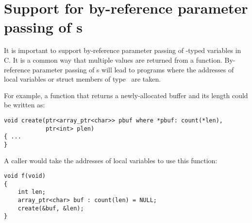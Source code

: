 \section{Support for by-reference parameter passing of \protect\arrayptr s}

It is important to support by-reference parameter passing of \arrayptr-typed variables
in C.  It is a common way that multiple values are returned from a function.  By-reference parameter
passing of \arrayptr s will lead to programs where the addresses of local variables or struct
members of type \arrayptr\ are taken.

For example, a function that returns a newly-allocated buffer and its length could be written as:
\begin{lstlisting}
void create(ptr<array_ptr<char>> pbuf where *pbuf: count(*len),
            ptr<int> plen)
{ ...
}
\end{lstlisting}
A caller would take the addresses of local variables to use this function:
\begin{lstlisting}
void f(void)
{
    int len;
    array_ptr<char> buf : count(len) = NULL;
    create(&buf, &len);
}
\end{lstlisting}


